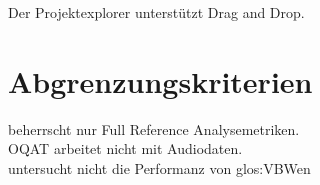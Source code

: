  Der Projektexplorer unterstützt Drag and Drop.
\section{Abgrenzungskriterien}
\setcounter{counterKriterien}{0}
 \projektTitel beherrscht nur Full Reference  Analysemetriken.\\
 \gls{OQAT} arbeitet nicht mit Audiodaten.\\
 \projektTitel untersucht nicht die Performanz von \gls{glos:VBW}en\\
